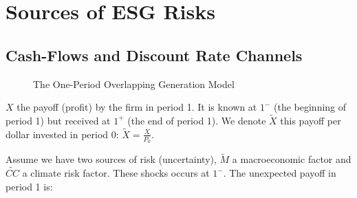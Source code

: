 \chapter{Sources of ESG Risks}


\section{Cash-Flows and Discount Rate Channels}

\begin{figure}[htbp]
    \centering
    \caption{The One-Period Overlapping Generation Model}
    \label{fig:fig01}
\end{figure}

$X$ the payoff (profit) by the
firm in period 1. It is known at $1^{-}$ (the beginning
of period 1) but received at $1^{+}$ (the end of period 1).
We denote $\tilde{X}$ this payoff per dollar 
invested in period 0: $\tilde{X} = \frac{X}{P_0}$.

Assume we have two sources of risk (uncertainty), $\tilde{M}$
a macroeconomic factor and $\tilde{CC}$ a climate risk factor.
These shocks occurs at $1^{-}$.
The unexpected payoff in period 1 is:

